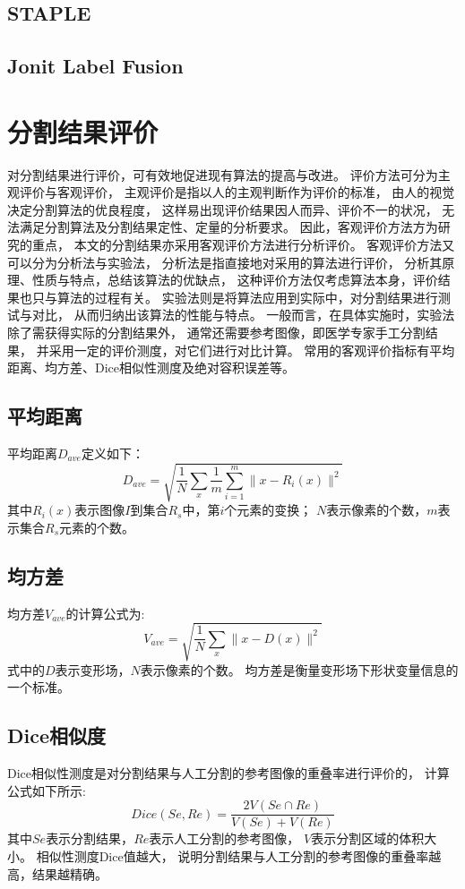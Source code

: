 \subsection{STAPLE}

\subsection{Jonit Label Fusion}

\section{分割结果评价}%
对分割结果进行评价，可有效地促进现有算法的提高与改进。
评价方法可分为主观评价与客观评价，
主观评价是指以人的主观判断作为评价的标准，
由人的视觉决定分割算法的优良程度，
这样易出现评价结果因人而异、评价不一的状况，
无法满足分割算法及分割结果定性、定量的分析要求。
因此，客观评价方法方为研究的重点，
本文的分割结果亦采用客观评价方法进行分析评价。
客观评价方法又可以分为分析法与实验法，
分析法是指直接地对采用的算法进行评价，
分析其原理、性质与特点，总结该算法的优缺点，
这种评价方法仅考虑算法本身，评价结果也只与算法的过程有关。
实验法则是将算法应用到实际中，对分割结果进行测试与对比，
从而归纳出该算法的性能与特点。
一般而言，在具体实施时，实验法除了需获得实际的分割结果外，
通常还需要参考图像，即医学专家手工分割结果，
并采用一定的评价测度，对它们进行对比计算。
常用的客观评价指标有平均距离、均方差、Dice相似性测度及绝对容积误差等。
\subsection{平均距离}
平均距离$D_{ave}$定义如下：
\begin{equation}
  D_{ave}=\sqrt{\frac{1}{N}\sum_x\frac{1}{m}\sum_{i=1}^m\lVert x-R_i(x)\rVert^2}
\end{equation}
其中$R_i(x)$表示图像$I$到集合$R_s$中，第$i$个元素的变换；
$N$表示像素的个数，$m$表示集合$R_s$元素的个数。
\subsection{均方差}
均方差$V_{ave}$的计算公式为:
\begin{equation}
  V_{ave}=\sqrt{\frac{1}{N}\sum_x\lVert x-D(x)\rVert^2}
\end{equation}
式中的$D$表示变形场，$N$表示像素的个数。
均方差是衡量变形场下形状变量信息的一个标准。
\subsection{Dice相似度}
Dice相似性测度是对分割结果与人工分割的参考图像的重叠率进行评价的，
计算公式如下所示:
\begin{equation}
  Dice(Se,Re)=\frac{2V(Se\cap Re)}{V(Se)+V(Re)}
\end{equation}
其中$Se$表示分割结果，$Re$表示人工分割的参考图像，
$V$表示分割区域的体积大小。
相似性测度Dice值越大，
说明分割结果与人工分割的参考图像的重叠率越高，结果越精确。
